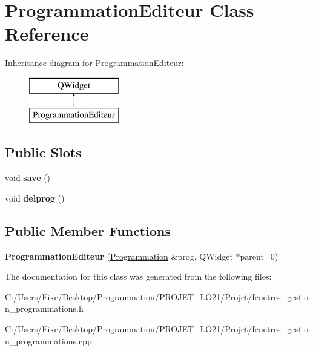 \hypertarget{class_programmation_editeur}{}\section{Programmation\+Editeur Class Reference}
\label{class_programmation_editeur}
Inheritance diagram for Programmation\+Editeur\+:\begin{figure}[H]
\begin{center}
\leavevmode
\includegraphics[height=2.000000cm]{class_programmation_editeur}
\end{center}
\end{figure}
\subsection*{Public Slots}
\begin{DoxyCompactItemize}
\item 
\hypertarget{class_programmation_editeur_adb24fbcddc3fd7b7bbca7694a1fbd78a}{}void {\bfseries save} ()\label{class_programmation_editeur_adb24fbcddc3fd7b7bbca7694a1fbd78a}

\item 
\hypertarget{class_programmation_editeur_a52b21cd0678fbff09e94631fb22329ec}{}void {\bfseries delprog} ()\label{class_programmation_editeur_a52b21cd0678fbff09e94631fb22329ec}

\end{DoxyCompactItemize}
\subsection*{Public Member Functions}
\begin{DoxyCompactItemize}
\item 
\hypertarget{class_programmation_editeur_a80551929ea9c20e203e340a1c1247590}{}{\bfseries Programmation\+Editeur} (\hyperlink{class_programmation}{Programmation} \&prog, Q\+Widget $\ast$parent=0)\label{class_programmation_editeur_a80551929ea9c20e203e340a1c1247590}

\end{DoxyCompactItemize}


The documentation for this class was generated from the following files\+:\begin{DoxyCompactItemize}
\item 
C\+:/\+Users/\+Fixe/\+Desktop/\+Programmation/\+P\+R\+O\+J\+E\+T\+\_\+\+L\+O21/\+Projet/fenetres\+\_\+gestion\+\_\+programmations.\+h\item 
C\+:/\+Users/\+Fixe/\+Desktop/\+Programmation/\+P\+R\+O\+J\+E\+T\+\_\+\+L\+O21/\+Projet/fenetres\+\_\+gestion\+\_\+programmations.\+cpp\end{DoxyCompactItemize}

